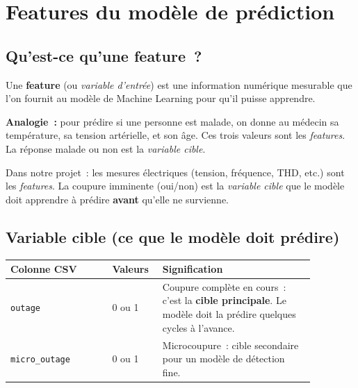 \documentclass[12pt,a4paper]{article}
\begin{document}
\section{Features du modèle de prédiction}
\label{sec:features}

\subsection{Qu'est-ce qu'une feature~?}

\begin{mdframed}[style=encadre]
Une \textbf{feature} (ou \emph{variable d'entrée}) est une information
numérique mesurable que l'on fournit au modèle de Machine Learning
pour qu'il puisse apprendre.

\medskip
\noindent
\textbf{Analogie~:} pour prédire si une personne est malade, on donne
au médecin sa température, sa tension artérielle, et son âge.
Ces trois valeurs sont les \emph{features}. La réponse
\og{}malade ou non\fg{} est la \emph{variable cible}.

\medskip
\noindent
Dans notre projet~: les mesures électriques (tension, fréquence,
THD, etc.) sont les \emph{features}. La coupure imminente (oui/non)
est la \emph{variable cible} que le modèle doit apprendre à prédire
\textbf{avant} qu'elle ne survienne.
\end{mdframed}

\subsection{Variable cible (ce que le modèle doit prédire)}

\begin{center}
\begin{tabular}{p{0.3\linewidth} p{0.12\linewidth} p{0.45\linewidth}}
\toprule
\textbf{Colonne CSV} & \textbf{Valeurs} & \textbf{Signification} \\
\midrule
\texttt{outage}      & 0 ou 1 &
  Coupure complète en cours~: c'est la \textbf{cible principale}.
  Le modèle doit la prédire quelques cycles à l'avance. \\
\texttt{micro\_outage} & 0 ou 1 &
  Microcoupure~: cible secondaire pour un modèle de détection fine. \\
\bottomrule
\end{tabular}
\end{center}
\end{document}
